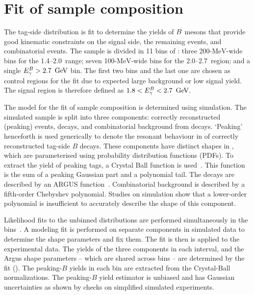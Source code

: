 \section{Fit of sample composition}\label{sec:fitting_procedure}

The tag-side \Mbc distribution is fit to determine the yields of $B$ mesons that provide good kinematic constraints on the signal side, the remaining \qqbar events, and combinatorial \BB events. The sample is divided in 11 bins of \EB: three 200-$\si{\MeV}$-wide bins for the 1.4--2.0~\gev range; seven 100-$\si{\MeV}$-wide bins for the 2.0--2.7~\gev region; and a single ${E^B_{\gamma}}>2.7~\mathrm{\,Ge\kern -0.1em V}$ bin. The first two bins and the last one are chosen as control regions for the fit due to expected large background or low signal yield. The signal region is therefore defined as \mbox{$1.8<{E^B_{\gamma}}<2.7~\mathrm{\,Ge\kern -0.1em V}$}.

The model for the fit of sample composition is determined using simulation. The simulated sample is split into three components: correctly reconstructed (peaking) \BB events, \qqbar decays, and combinatorial background from \BB decays. `Peaking' henceforth is used generically to denote the resonant behaviour in \Mbc of correctly reconstructed tag-side $B$ decays. These components have distinct shapes in \Mbc, which are parameterised using probability distribution functions (PDFs). To extract the yield of peaking \BB tags, a Crystal Ball function is used~\cite{CrystalBall:1986xj}. This function is the sum of a peaking Gaussian part and a polynomial tail. The \qqbar decays are described by an ARGUS function~\cite{ALBRECHT1990278}. Combinatorial \BB background is described by a fifth-order Chebyshev polynomial. Studies on simulation show that a lower-order polynomial is insufficient to accurately describe the \Mbc shape of this component. 





Likelihood fits to the unbinned \Mbc distributions are performed simultaneously in the \EB bins~\cite{zfit}. A modeling fit is performed on separate components in simulated data to determine the shape parameters and fix them. The fit is then is applied to the experimental data. The yields of the three components in each \EB interval, and the Argus shape parameters -- which are shared across bins -- are determined by the fit (). The peaking-$B$ yields in each \EB bin are extracted from the Crystal-Ball normalizations. The peaking-$B$ yield estimator is unbiased and has Gaussian uncertainties as shown by checks on simplified simulated experiments.


